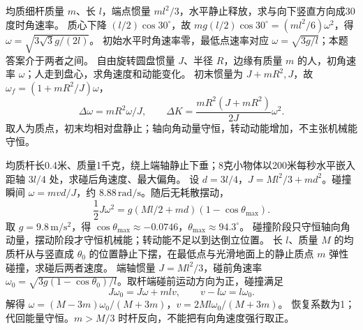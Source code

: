 \problemtext 均质细杆质量 $m$、长 $l$，端点惯量 $ml^2/3$，水平静止释放，求与向下竖直方向成30度时角速率。
\workings 质心下降 $(l/2)\cos30^\circ$，故 $mg(l/2)\cos30^\circ=(ml^2/6)\omega^2$，得 $\omega=\sqrt{3\sqrt3g/(2l)}$。
\crosscheck 初始水平时角速率零，最低点速率对应 $\omega=\sqrt{3g/l}$；本题答案介于两者之间。
\problemtext 自由旋转圆盘惯量 $J$、半径 $R$，边缘有质量 $m$ 的人，初角速率 $\omega$；人走到盘心，求角速度和动能变化。
\workings 初末惯量为 $J+mR^2,J$，故 $\omega_f=(1+mR^2/J)\omega$，
\[
\Delta\omega=mR^2\omega/J,\qquad
\Delta K=\frac{mR^2(J+mR^2)}{2J}\omega^2.
\]
\crosscheck 取人为质点，初末均相对盘静止；轴向角动量守恒，转动动能增加，不主张机械能守恒。

\problemtext 均质杆长0.4米、质量1千克，绕上端轴静止下垂；8克小物体以200米每秒水平嵌入距轴 $3l/4$ 处，求碰后角速度、最大偏角。
\workings 设 $d=3l/4$，$J=Ml^2/3+md^2$。碰撞瞬间 $\omega=mvd/J$，约 $8.88\,\mathrm{rad/s}$。随后无耗散摆动，
\[
\frac12J\omega^2=g(Ml/2+md)(1-\cos\theta_{\max}).
\]
取 $g=9.8\,\mathrm{m/s^2}$，得 $\cos\theta_{\max}\approx-0.0746$，$\theta_{\max}\approx94.3^\circ$。
\crosscheck 碰撞阶段只守恒轴向角动量，摆动阶段才守恒机械能；转动能不足以到达倒立位置。
\problemtext 长 $l$、质量 $M$ 的均质杆从与竖直成 $\theta_0$ 的位置静止下摆，在最低点与光滑地面上的静止质点 $m$ 弹性碰撞，求碰后两者速度。
\workings 端轴惯量 $J=Ml^2/3$，碰前角速率 $\omega_0=\sqrt{3g(1-\cos\theta_0)/l}$。取杆端碰前运动方向为正，碰撞满足
\[
J\omega_0=J\omega+mlv,\qquad v-l\omega=l\omega_0.
\]
解得 $\omega=(M-3m)\omega_0/(M+3m)$，$v=2Ml\omega_0/(M+3m)$。
\crosscheck 恢复系数为1；代回能量守恒。$m>M/3$ 时杆反向，不能把有向角速度强行取正。

